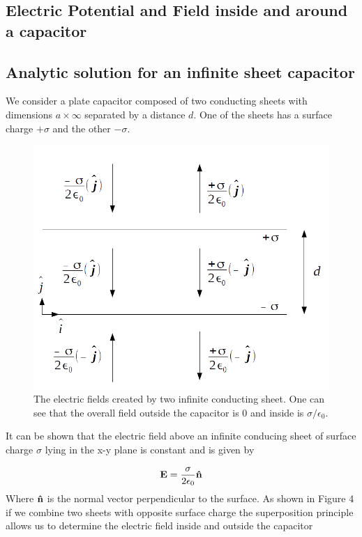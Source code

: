 \documentclass[10 pt]{article}
\numberwithin{equation}{section}
\begin{document}
\begin{multicols}{2}

\section{Electric Potential and Field inside and around a capacitor}

\subsection{Analytic solution for an infinite sheet capacitor}

We consider a plate capacitor composed of two conducting sheets with dimensions $a \times \infty$ separated by a distance $d$. One of the sheets has a surface charge $+\sigma$ and the other $-\sigma$. 

\begin{figure}[H]
\includegraphics[width=\linewidth]{capacitor}
\caption{The electric fields created by two infinite conducting sheet. One can see that the overall field outside the capacitor is 0 and inside is $\sigma /\epsilon_0$.}
\end{figure}

 It can be shown that the electric field above an infinite conducing sheet of surface charge $\sigma$ lying in the x-y plane is constant and is given by \cite{Cap}

\begin{equation}
\bf E \rm = \frac{\sigma}{2 \epsilon_0} \bf \hat n
\end{equation}
Where $\bf \hat n$ is the normal vector perpendicular to the surface. As shown in Figure 4 if we combine two sheets with opposite surface charge the superposition principle allows us to determine the electric field inside and outside the capacitor


\end{multicols}
\end{document}
